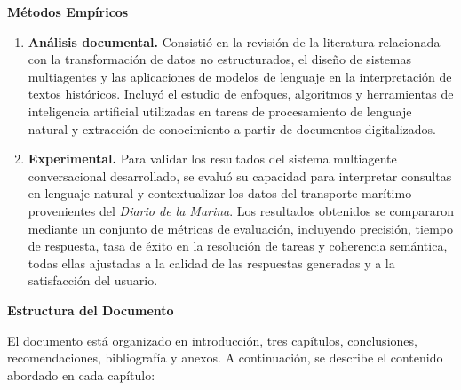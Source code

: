 \textbf{Métodos Empíricos}

\begin{enumerate}
	\item \textbf{Análisis documental.} Consistió en la revisión de la literatura relacionada con la transformación de datos no estructurados, el diseño de sistemas multiagentes y las aplicaciones de modelos de lenguaje en la interpretación de textos históricos. Incluyó el estudio de enfoques, algoritmos y herramientas de inteligencia artificial utilizadas en tareas de procesamiento de lenguaje natural y extracción de conocimiento a partir de documentos digitalizados.
	
	\item \textbf{Experimental.} Para validar los resultados del sistema multiagente conversacional desarrollado, se evaluó su capacidad para interpretar consultas en lenguaje natural y contextualizar los datos del transporte marítimo provenientes del \textit{Diario de la Marina}. Los resultados obtenidos se compararon mediante un conjunto de métricas de evaluación, incluyendo precisión, tiempo de respuesta, tasa de éxito en la resolución de tareas y coherencia semántica, todas ellas ajustadas a la calidad de las respuestas generadas y a la satisfacción del usuario.
\end{enumerate}

\textbf{Estructura del Documento}

El documento está organizado en introducción, tres capítulos, conclusiones, recomendaciones, bibliografía y anexos. A continuación, se describe el contenido abordado en cada capítulo:

